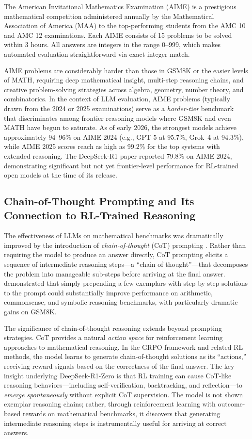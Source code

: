 The American Invitational Mathematics Examination (AIME) is a prestigious mathematical competition administered annually by the Mathematical Association of America (MAA) to the top-performing students from the AMC 10 and AMC 12 examinations. Each AIME consists of 15 problems to be solved within 3 hours. All answers are integers in the range 0--999, which makes automated evaluation straightforward via exact integer match.

AIME problems are considerably harder than those in GSM8K or the easier levels of MATH, requiring deep mathematical insight, multi-step reasoning chains, and creative problem-solving strategies across algebra, geometry, number theory, and combinatorics. In the context of LLM evaluation, AIME problems (typically drawn from the 2024 or 2025 examinations) serve as a \emph{harder-tier} benchmark that discriminates among frontier reasoning models where GSM8K and even MATH have begun to saturate. As of early 2026, the strongest models achieve approximately 94--96\% on AIME 2024 (e.g., GPT-5 at 95.7\%, Grok~4 at 94.3\%), while AIME 2025 scores reach as high as 99.2\% for the top systems with extended reasoning. The DeepSeek-R1 paper reported 79.8\% on AIME 2024, demonstrating significant but not yet frontier-level performance for RL-trained open models at the time of its release.

\subsection{Chain-of-Thought Prompting and Its Connection to RL-Trained Reasoning}

The effectiveness of LLMs on mathematical benchmarks was dramatically improved by the introduction of \emph{chain-of-thought} (CoT) prompting \cite{wei2022chainofthought}. Rather than requiring the model to produce an answer directly, CoT prompting elicits a sequence of intermediate reasoning steps---a ``chain of thought''---that decomposes the problem into manageable sub-steps before arriving at the final answer. \cite{wei2022chainofthought} demonstrated that simply prepending a few exemplars with step-by-step solutions to the prompt could substantially improve performance on arithmetic, commonsense, and symbolic reasoning benchmarks, with particularly dramatic gains on GSM8K.

The significance of chain-of-thought reasoning extends beyond prompting strategies. CoT provides a natural \emph{action space} for reinforcement learning approaches to mathematical reasoning. In the GRPO framework and related RL methods, the model learns to generate chain-of-thought solutions as its ``actions,'' receiving reward signals based on the correctness of the final answer. The key insight underlying DeepSeek-R1-Zero is that RL training can cause CoT-like reasoning behaviors---including self-verification, backtracking, and reflection---to \emph{emerge spontaneously} without explicit CoT supervision. The model is not shown exemplar reasoning chains; rather, through reinforcement learning with outcome-based rewards on mathematical benchmarks, it discovers that generating intermediate reasoning steps is instrumentally useful for arriving at correct answers.

